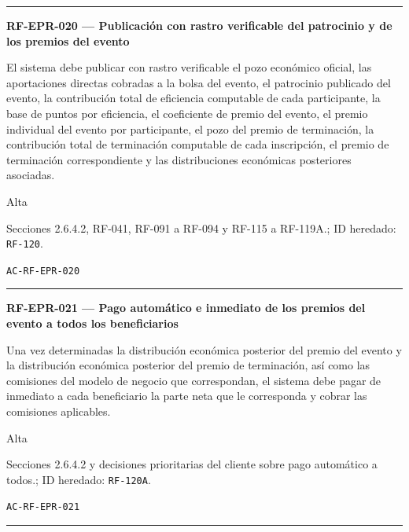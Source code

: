 \documentclass[10pt,letterpaper]{article}
\begin{document}
\vspace{0.25em}\hrule\vspace{0.65em}
\noindent\textbf{RF-EPR-020 --- Publicación con rastro verificable del patrocinio y de los premios del evento}\par
\begin{description}[style=nextline,leftmargin=3.15cm,labelwidth=2.8cm,font=\normalfont\bfseries]
\item[Obligación] El sistema debe publicar con rastro verificable el pozo económico oficial, las aportaciones directas cobradas a la bolsa del evento, el patrocinio publicado del evento, la contribución total de eficiencia computable de cada participante, la base de puntos por eficiencia, el coeficiente de premio del evento, el premio individual del evento por participante, el pozo del premio de terminación, la contribución total de terminación computable de cada inscripción, el premio de terminación correspondiente y las distribuciones económicas posteriores asociadas.
\item[Prioridad] Alta
\item[Procedencia] Secciones 2.6.4.2, RF-041, RF-091 a RF-094 y RF-115 a RF-119A.; ID heredado: \texttt{RF-120}.
\item[Verificación] \texttt{AC-RF-EPR-020}
\end{description}
\vspace{0.25em}\hrule\vspace{0.65em}
\noindent\textbf{RF-EPR-021 --- Pago automático e inmediato de los premios del evento a todos los beneficiarios}\par
\begin{description}[style=nextline,leftmargin=3.15cm,labelwidth=2.8cm,font=\normalfont\bfseries]
\item[Obligación] Una vez determinadas la distribución económica posterior del premio del evento y la distribución económica posterior del premio de terminación, así como las comisiones del modelo de negocio que correspondan, el sistema debe pagar de inmediato a cada beneficiario la parte neta que le corresponda y cobrar las comisiones aplicables.
\item[Prioridad] Alta
\item[Procedencia] Secciones 2.6.4.2 y decisiones prioritarias del cliente sobre pago automático a todos.; ID heredado: \texttt{RF-120A}.
\item[Verificación] \texttt{AC-RF-EPR-021}
\end{description}
\vspace{0.25em}\hrule\vspace{0.65em}
\end{document}

